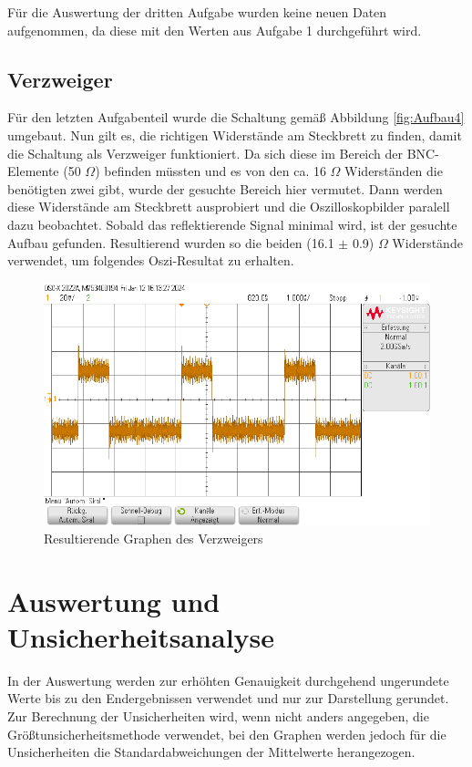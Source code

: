 \documentclass[12pt,a4paper,twoside]{article}
\begin{document}
Für die Auswertung der dritten Aufgabe wurden keine neuen Daten aufgenommen, da diese mit den Werten aus Aufgabe 1 durchgeführt wird.

\subsection{Verzweiger}

Für den letzten Aufgabenteil wurde die Schaltung gemäß Abbildung \ref{fig:Aufbau4} umgebaut.
Nun gilt es, die richtigen Widerstände am Steckbrett zu finden, damit die Schaltung als Verzweiger funktioniert.
Da sich diese im Bereich der BNC-Elemente (50 $\Omega$) befinden müssten und es von den ca. 16 $\Omega$ Widerständen die benötigten zwei gibt, wurde der gesuchte Bereich hier vermutet.
Dann werden diese Widerstände am Steckbrett ausprobiert und die Oszilloskopbilder paralell dazu beobachtet.
Sobald das reflektierende Signal minimal wird, ist der gesuchte Aufbau gefunden.
Resultierend wurden so die beiden (16.1 $\pm$ 0.9) $\Omega$ Widerstände verwendet, um folgendes Oszi-Resultat zu erhalten.

\begin{figure}[H]
    \centering
    \includegraphics[width=0.6\linewidth]{nudes/Messungen/4/scope_12.png}
    \caption{Resultierende Graphen des Verzweigers}
    \label{fig:GraphA4}
\end{figure}


\section{Auswertung und Unsicherheitsanalyse} %

In der Auswertung werden zur erhöhten Genauigkeit durchgehend ungerundete Werte bis zu den Endergebnissen verwendet und nur zur Darstellung gerundet. \\
Zur Berechnung der Unsicherheiten wird, wenn nicht anders angegeben, die Größtunsicherheitsmethode verwendet, bei den Graphen werden jedoch für die Unsicherheiten die Standardabweichungen der Mittelwerte herangezogen. 
\end{document}
